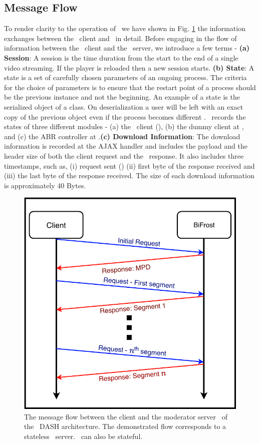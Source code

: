 \subsection{Message Flow}
\indent To render clarity to the operation of \bel\ we have shown in Fig. \ref{fig:chap05:info_xchang} the information exchanges between the \bel\ client and \servname\ in detail. Before engaging in the flow of information between the \bel\ client and the \servname\ server, we introduce a few terms - \textbf{(a) Session}: A session is the time duration from the start to the end of a single video streaming. If the player is reloaded then a new session starts. \textbf{(b) State}: A state is a set of carefully chosen parameters of an ongoing process. The criteria for the choice of parameters is to ensure that the restart point of a process should be the previous instance and not the beginning. An example of a state is the serialized object of a class. On deserialization a user will be left with an exact copy of the previous object even if the process becomes different . \bel\ records the states of three different modules - (a) the \bel\ client (), (b) the dummy client at \servname, and (c) the ABR controller at \servname.\textbf{(c)  Download Information}: The download information is recorded at the AJAX handler and includes the payload and the header size of both the client request and the \servname\ response. It also includes three timestamps, such as, (i) request sent () (ii) first byte of the response received and (iii) the last byte of the response received. The size of each download information is approximately 40 Bytes.\\
\begin{figure}[h]
    \centering
    \includegraphics[width = 0.8\linewidth]{./images/splitDASHTransaction.pdf}
    \caption{The message flow between the client and the moderator server \servname\ of the \bel\ \ac{DASH} architecture. The demonstrated flow corresponds to a stateless \servname\ server. \servname\ can also be stateful.}
    \label{fig:chap05:info_xchang}
\end{figure}{}
